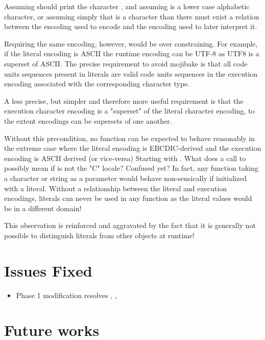 \documentclass{wg21}
\begin{document}
Assuming  should print the character , and assuming  is a lower case alphabetic character,
or assuming simply that  is a character than there must exist a relation between the encoding used to encode 
and the encoding used to later interpret it.

Requiring the same encoding, however, would be over constraining.
For example, if the literal encoding is ASCII the runtime encoding can be UTF-8 as UTF8 is a superset of ASCII.
The precise requirement to avoid mojibake is that all code units sequences present in literals are valid code units sequences in
the execution encoding associated with the corresponding character type.

A less precise, but simpler and therefore more useful requirement is that the execution character encoding is a "superset" of the literal character encoding, to the extent encodings can be supersets of one another.

Without this precondition, no function can be expected to behave reasonably in the extreme case where the literal encoding is EBCDIC-derived and the execution encoding is ASCII derived (or vice-versa)
Starting with . What does a call to  possibly mean if  is not the "C" locale?
Confused yet?
In fact, any function taking a character or string as a parameter would behave non-sensically if initialized with a literal.
Without a relationship between the literal and execution encodings, literals can never be used in any function as the literal values would be in a different domain!

This observation is reinforced and aggravated by the fact that it is generally not possible to distinguish literals from other objects at runtime!

\section{Issues Fixed}

\begin{itemize}
    \item Phase 1 modification resolves , , 
\end{itemize}

\section{Future works}
\end{document}
